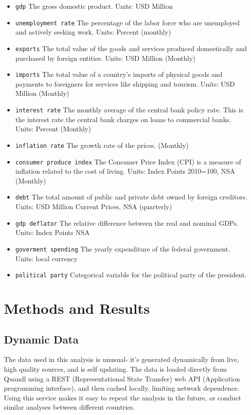 \documentclass[12pt]{article}
\begin{document}
\begin{itemize}
    \item {\tt gdp} The gross domestic product. Units: USD Million
    \item {\tt unemployment rate} The percentage of the labor force who are unemployed and actively seeking work. Units: Percent (monthly)
    \item {\tt exports} The total value of the goods and services
produced domestically and purchased by foreign entities. Units: USD Million (Monthly)
    \item {\tt imports} The total value of a country's imports of physical goods and payments to foreigners for services like shipping and tourism. Units: USD Million (Monthly)
    \item {\tt interest rate} The monthly average of the central bank policy rate. This is the interest rate the central bank charges on loans to commercial banks. Units: Percent (Monthly)
    \item {\tt inflation rate} The growth rate of the prices. (Monthly)
    \item {\tt consumer produce index} The Consumer Price Index (CPI) is a measure of inflation related to the cost of living. Units: Index Points 2010=100, NSA (Monthly)
    \item {\tt debt} The total amount of public and private debt owned by foreign creditors. Units: USD Million Current Prices, NSA (quarterly)
    \item {\tt gdp deflator} The relative difference between the real and nominal GDPs. Units: Index Points NSA
    \item {\tt goverment spending} The yearly expenditure of the federal
        government. Units: local currency
    \item {\tt political party} Categorical variable for the political
party of the president.
\end{itemize}

\section{Methods and Results}

\subsection{Dynamic Data}

The data used in this analysis is unusual- it's generated dynamically from
live, high quality sources, and is self updating. The data is loaded directly from Quandl using a REST (Representational 
State Transfer) web API (Application programming interface), and then
cached locally, limiting network dependence.
Using this service makes it easy to repeat the analysis in the future, or conduct similar analyses between
different countries.
\end{document}
